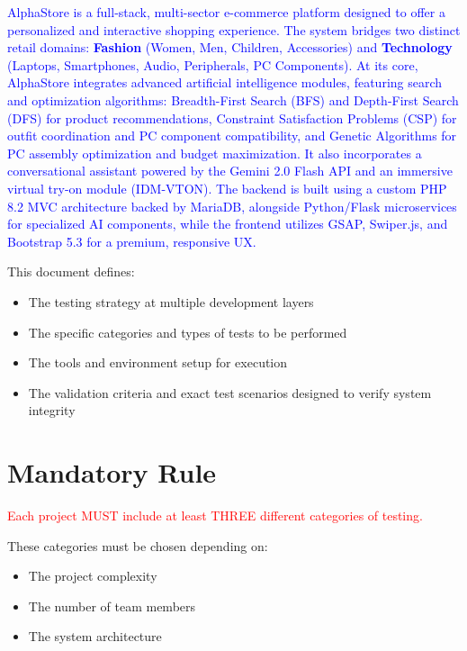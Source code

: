 \documentclass[12pt,a4paper]{article}
\newcommand{\student}[1]{\textcolor{blue}{#1}} %
\newcommand{\important}[1]{\textcolor{red}{#1}} %
\begin{document}
\student{AlphaStore is a full-stack, multi-sector e-commerce platform designed to offer a personalized and interactive shopping experience. The system bridges two distinct retail domains: \textbf{Fashion} (Women, Men, Children, Accessories) and \textbf{Technology} (Laptops, Smartphones, Audio, Peripherals, PC Components). At its core, AlphaStore integrates advanced artificial intelligence modules, featuring search and optimization algorithms: Breadth-First Search (BFS) and Depth-First Search (DFS) for product recommendations, Constraint Satisfaction Problems (CSP) for outfit coordination and PC component compatibility, and Genetic Algorithms for PC assembly optimization and budget maximization. It also incorporates a conversational assistant powered by the Gemini 2.0 Flash API and an immersive virtual try-on module (IDM-VTON). The backend is built using a custom PHP 8.2 MVC architecture backed by MariaDB, alongside Python/Flask microservices for specialized AI components, while the frontend utilizes GSAP, Swiper.js, and Bootstrap 5.3 for a premium, responsive UX.}

\vspace{0.3cm}

This document defines:
\begin{itemize}
\item The testing strategy at multiple development layers
\item The specific categories and types of tests to be performed
\item The tools and environment setup for execution
\item The validation criteria and exact test scenarios designed to verify system integrity
\end{itemize}

\newpage

\section{Mandatory Rule}

\important{Each project MUST include at least THREE different categories of testing.}

These categories must be chosen depending on:
\begin{itemize}
\item The project complexity
\item The number of team members
\item The system architecture
\end{itemize}
\end{document}
